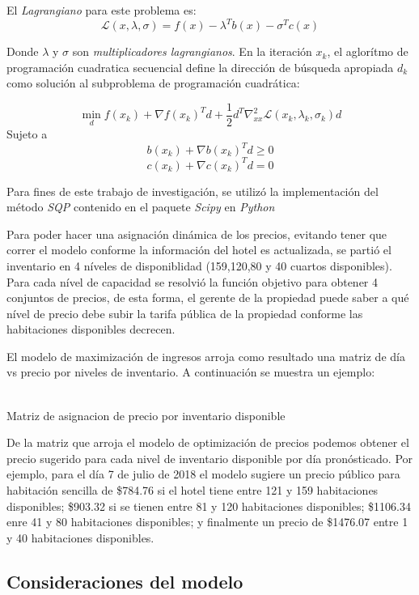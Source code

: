 El \emph{Lagrangiano} para este problema es: $$\mathcal{L}(x,\lambda,\sigma)=f(x)-\lambda^Tb(x)-\sigma^Tc(x)$$

Donde $\lambda$ y $\sigma$ son \emph{multiplicadores lagrangianos}. En la iteración $x_k$, el aglorítmo de programación cuadratica secuencial define la dirección de búsqueda apropiada $d_k$ como solución al subproblema de programación cuadrática: 

$$\min_d f(x_k) + \nabla f(x_k)^T d + \frac{1}{2}d^T \nabla_{xx}^2 \mathcal{L} (x_k,\lambda_k,\sigma_k)d$$
Sujeto a
$$b(x_k) + \nabla b(x_k)^T d\geq 0$$
$$c(x_k) + \nabla c(x_k)^T d = 0$$

Para fines de este trabajo de investigación, se utilizó la implementación del método \emph{SQP} contenido en el paquete \emph{Scipy} en  \emph{Python}

Para poder hacer una asignación dinámica de los precios, evitando tener que correr el modelo conforme la información del hotel es actualizada, se partió el inventario en 4 níveles de disponiblidad (159,120,80 y 40 cuartos disponibles). Para cada nível de capacidad se resolvió la función objetivo para obtener 4 conjuntos de precios, de esta forma, el gerente de la propiedad puede saber a qué nível de precio debe subir la tarifa pública de la propiedad conforme las habitaciones disponibles decrecen.

El modelo de maximización de ingresos arroja como resultado una matriz de día vs precio por niveles de inventario. A continuación se muestra un ejemplo:
\\
\\

\begin{table}[H]
  \centering
  \par
  \caption{Matriz de asignacion de precio por inventario disponible} 
\end{table}

De la matriz que arroja el modelo de optimización de precios podemos obtener el precio sugerido para cada nivel de inventario disponible por día pronósticado. Por ejemplo, para el día 7 de julio de 2018 el modelo sugiere un precio público para habitación sencilla de \$784.76 si el hotel tiene entre 121 y 159 habitaciones disponibles; \$903.32 si se tienen entre 81 y 120 habitaciones disponibles; \$1106.34 enre 41 y 80 habitaciones disponibles; y finalmente un precio de \$1476.07 entre 1 y 40 habitaciones disponibles.

\subsection*{Consideraciones del modelo}


